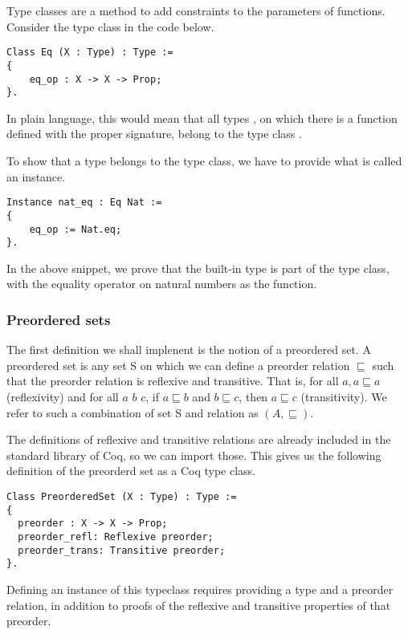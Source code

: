 Type classes are a method to add constraints to the parameters of functions.
Consider the type class  in the code below.

\begin{verbatim}
Class Eq (X : Type) : Type :=
{
	eq_op : X -> X -> Prop;
}.
\end{verbatim}

In plain language, this would mean that all types , on which there is a
function  defined with the proper signature, belong to the type
class . 

To show that a type belongs to the type class, we have to provide what is
called an instance.

\begin{verbatim}
Instance nat_eq : Eq Nat :=
{
	eq_op := Nat.eq;
}.
\end{verbatim}

In the above snippet, we prove that the built-in  type is part of
the  type class, with the equality operator on natural numbers as the
 function.

\subsubsection{Preordered sets}
The first definition we shall implenent is the notion of a preordered set. 
A preordered set is any set S on which we can define a preorder relation
$\sqsubseteq$ such that the preorder relation is reflexive and transitive. That
is, for all $a, a \sqsubseteq a$ (reflexivity) and for all $a$ $b$ $c$, if $a
\sqsubseteq b$ and $b \sqsubseteq c$, then $a \sqsubseteq c$ (transitivity).
We refer to such a combination of set S and relation as $(A, \sqsubseteq)$.

The definitions of reflexive and transitive relations are already included in
the standard library of Coq, so we can import those. This gives us the
following definition of the preorderd set as a Coq type class.

\begin{verbatim}
Class PreorderedSet (X : Type) : Type :=
{
  preorder : X -> X -> Prop;
  preorder_refl: Reflexive preorder;
  preorder_trans: Transitive preorder;
}.
\end{verbatim}

Defining an instance of this typeclass requires providing a type and a preorder
relation, in addition to proofs of the reflexive and transitive properties of
that preorder. 


